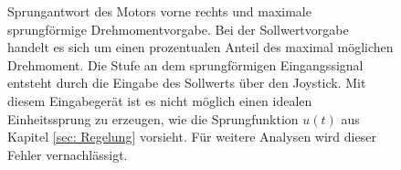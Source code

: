 		\begin{figure}[H]
		\centering
		\caption{Sprungantwort des Motors vorne rechts und maximale  sprungförmige Drehmomentvorgabe. Bei der Sollwertvorgabe handelt es sich um einen prozentualen Anteil des maximal möglichen Drehmoment. Die Stufe an dem sprungförmigen Eingangssignal entsteht durch die Eingabe des Sollwerts über den Joystick. Mit diesem Eingabegerät ist es nicht möglich einen idealen Einheitssprung zu erzeugen, wie die Sprungfunktion $u(t)$ aus Kapitel \ref{sec: Regelung} vorsieht. Für weitere Analysen wird dieser Fehler vernachlässigt.}
		\label{fig: brr}
	\end{figure}